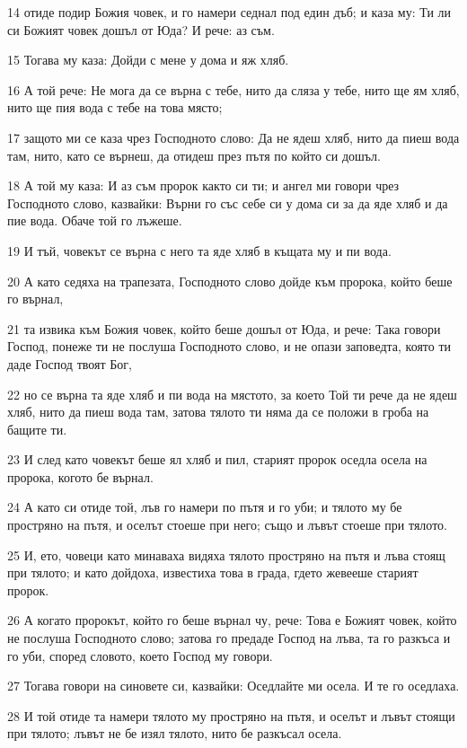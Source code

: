 \par 14 отиде подир Божия човек, и го намери седнал под един дъб; и каза му: Ти ли си Божият човек дошъл от Юда? И рече: аз съм.
\par 15 Тогава му каза: Дойди с мене у дома и яж хляб.
\par 16 А той рече: Не мога да се върна с тебе, нито да сляза у тебе, нито ще ям хляб, нито ще пия вода с тебе на това място;
\par 17 защото ми се каза чрез Господното слово: Да не ядеш хляб, нито да пиеш вода там, нито, като се върнеш, да отидеш през пътя по който си дошъл.
\par 18 А той му каза: И аз съм пророк както си ти; и ангел ми говори чрез Господното слово, казвайки: Върни го със себе си у дома си за да яде хляб и да пие вода. Обаче той го лъжеше.
\par 19 И тъй, човекът се върна с него та яде хляб в къщата му и пи вода.
\par 20 А като седяха на трапезата, Господното слово дойде към пророка, който беше го върнал,
\par 21 та извика към Божия човек, който беше дошъл от Юда, и рече: Така говори Господ, понеже ти не послуша Господното слово, и не опази заповедта, която ти даде Господ твоят Бог,
\par 22 но се върна та яде хляб и пи вода на мястото, за което Той ти рече да не ядеш хляб, нито да пиеш вода там, затова тялото ти няма да се положи в гроба на бащите ти.
\par 23 И след като човекът беше ял хляб и пил, старият пророк оседла осела на пророка, когото бе върнал.
\par 24 А като си отиде той, лъв го намери по пътя и го уби; и тялото му бе простряно на пътя, и оселът стоеше при него; също и лъвът стоеше при тялото.
\par 25 И, ето, човеци като минаваха видяха тялото простряно на пътя и лъва стоящ при тялото; и като дойдоха, известиха това в града, гдето жевееше старият пророк.
\par 26 А когато пророкът, който го беше върнал чу, рече: Това е Божият човек, който не послуша Господното слово; затова го предаде Господ на лъва, та го разкъса и го уби, според словото, което Господ му говори.
\par 27 Тогава говори на синовете си, казвайки: Оседлайте ми осела. И те го оседлаха.
\par 28 И той отиде та намери тялото му простряно на пътя, и оселът и лъвът стоящи при тялото; лъвът не бе изял тялото, нито бе разкъсал осела.
